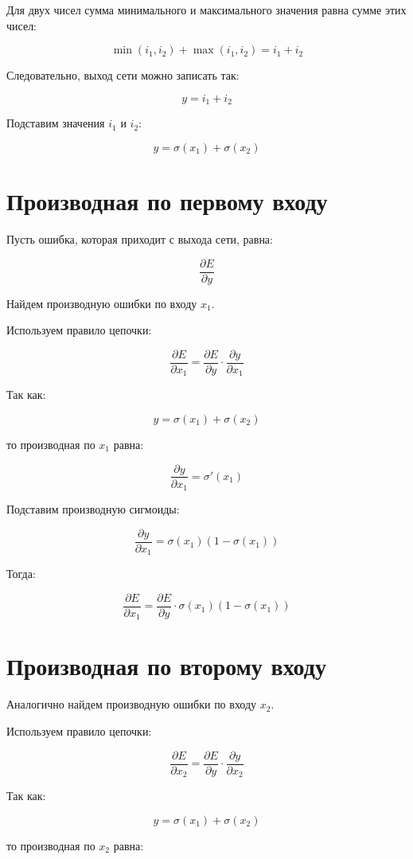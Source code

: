 \documentclass[a4paper,12pt]{article}
\begin{document}
Для двух чисел сумма минимального и максимального значения равна сумме этих чисел:

\[
\min(i_1, i_2) + \max(i_1, i_2) = i_1 + i_2
\]

Следовательно, выход сети можно записать так:

\[
y = i_1 + i_2
\]

Подставим значения $i_1$ и $i_2$:

\[
y = \sigma(x_1) + \sigma(x_2)
\]

\section*{Производная по первому входу}

Пусть ошибка, которая приходит с выхода сети, равна:

\[
\frac{\partial E}{\partial y}
\]

Найдем производную ошибки по входу $x_1$.

Используем правило цепочки:

\[
\frac{\partial E}{\partial x_1}
=
\frac{\partial E}{\partial y}
\cdot
\frac{\partial y}{\partial x_1}
\]

Так как:

\[
y = \sigma(x_1) + \sigma(x_2)
\]

то производная по $x_1$ равна:

\[
\frac{\partial y}{\partial x_1}
=
\sigma'(x_1)
\]

Подставим производную сигмоиды:

\[
\frac{\partial y}{\partial x_1}
=
\sigma(x_1)(1 - \sigma(x_1))
\]

Тогда:

\[
\frac{\partial E}{\partial x_1}
=
\frac{\partial E}{\partial y}
\cdot
\sigma(x_1)(1 - \sigma(x_1))
\]

\section*{Производная по второму входу}

Аналогично найдем производную ошибки по входу $x_2$.

Используем правило цепочки:

\[
\frac{\partial E}{\partial x_2}
=
\frac{\partial E}{\partial y}
\cdot
\frac{\partial y}{\partial x_2}
\]

Так как:

\[
y = \sigma(x_1) + \sigma(x_2)
\]

то производная по $x_2$ равна:
\end{document}
